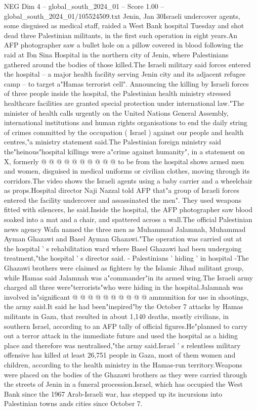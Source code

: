 \begin{textsample}{NEG Dim 4 – global\_south\_2024\_01 – Score 1.00 – global\_south\_2024\_01/105524509.txt}  \label{ex:f4_neg_085}
Jenin, Jan 30Israeli undercover agents, some disguised as medical staff, raided a West Bank hospital Tuesday and shot dead three Palestinian militants, in the first such operation in eight years.An AFP photographer saw a bullet hole on a pillow covered in blood following the raid at Ibn Sina Hospital in the northern city of Jenin, where Palestinians gathered around the bodies of those killed.The Israeli military said forces entered the hospital -- a major health facility serving Jenin city and its adjacent refugee camp -- to target a"Hamas terrorist cell".
Announcing the killing by Israeli forces of three people inside the hospital, the Palestinian health ministry stressed healthcare facilities are granted special protection under international law."The minister of health calls urgently on the United Nations General Assembly, international institutions and human rights organisations to end the daily string of crimes committed by the occupation ( Israel ) against our people and health centres,"a ministry statement said.The Palestinian foreign ministry said the"heinous"hospital killings were a"crime against humanity", in a statement on X, formerly @ @ @ @ @ @ @ @ @ @ to be from the hospital shows armed men and women, disguised in medical uniforms or civilian clothes, moving through its corridors.The video shows the Israeli agents using a baby carrier and a wheelchair as props.Hospital director Naji Nazzal told AFP that"a group of Israeli forces entered the facility undercover and assassinated the men".
They used weapons fitted with silencers, he said.Inside the hospital, the AFP photographer saw blood soaked into a mat and a chair, and spattered across a wall.The official Palestinian news agency Wafa named the three men as Muhammad Jalamnah, Muhammad Ayman Ghazawi and Basel Ayman Ghazawi."The operation was carried out at the hospital ' s rehabilitation ward where Basel Ghazawi had been undergoing treatment,"the hospital ' s director said. - Palestinians ' hiding ' in hospital -The Ghazawi brothers were claimed as fighters by the Islamic Jihad militant group, while Hamas said Jalamnah was a"commander"in its armed wing.The Israeli army charged all three were"terrorists"who were hiding in the hospital.Jalamnah was involved in"significant @ @ @ @ @ @ @ @ @ @ ammunition for use in shootings, the army said.It said he had been"inspired"by the October 7 attacks by Hamas militants in Gaza, that resulted in about 1,140 deaths, mostly civilians, in southern Israel, according to an AFP tally of official figures.He"planned to carry out a terror attack in the immediate future and used the hospital as a hiding place and therefore was neutralised,"the army said.Israel ' s relentless military offensive has killed at least 26,751 people in Gaza, most of them women and children, according to the health ministry in the Hamas-run territory.Weapons were placed on the bodies of the Ghazawi brothers as they were carried through the streets of Jenin in a funeral procession.Israel, which has occupied the West Bank since the 1967 Arab-Israeli war, has stepped up its incursions into Palestinian towns ands cities since October 7.

\end{textsample}
